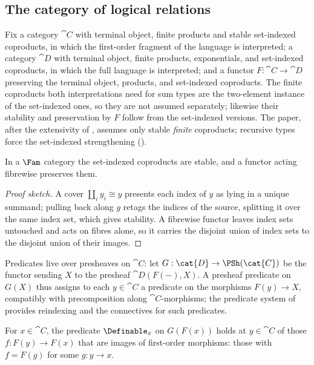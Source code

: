 \subsection{The category of logical relations}
\label{sec:conservativity:glueing}

Fix a category $\cat{C}$ with terminal object, finite products and stable set-indexed coproducts,
in which the first-order fragment of the language is interpreted; a category $\cat{D}$ with terminal
object, finite products, exponentials, and set-indexed coproducts, in which the full
language is interpreted; and a functor $F : \cat{C} \to \cat{D}$ preserving the terminal object,
products, and set-indexed coproducts. The finite coproducts both interpretations need for sum types
are the two-element instance of the set-indexed ones, so they are not assumed separately; likewise
their stability and preservation by $F$ follow from the set-indexed versions. The paper, after the
extensivity of \citet{fiore-simpson99}, assumes only stable \emph{finite} coproducts; recursive
types force the set-indexed strengthening ().

\begin{lemma}
\label{lem:conservativity:fam-stable-coproducts}
In a $\Fam$ category the set-indexed coproducts are stable, and a functor acting fibrewise
preserves them.
\end{lemma}

\begin{proof}[Proof sketch]
A cover $\coprod_i y_i \cong y$ presents each index of $y$ as lying in a unique summand; pulling
back along $g$ retags the indices of the source, splitting it over the same index set, which gives
stability. A fibrewise functor leaves index sets untouched and acts on fibres alone, so it carries
the disjoint union of index sets to the disjoint union of their images.
\end{proof}

Predicates live over presheaves on $\cat{C}$: let $G : \cat{D} \to \PSh(\cat{C})$ be the functor
sending $X$ to the presheaf $\cat{D}(F(-), X)$. A presheaf predicate on $G(X)$ thus
assigns to each $y \in \cat{C}$ a predicate on the morphisms $F(y) \to X$, compatibly with
precomposition along $\cat{C}$-morphisms; the predicate system of  provides
reindexing and the connectives for such predicates.

\begin{definition}[Definability]
\label{def:conservativity:definable}
For $x \in \cat{C}$, the predicate $\Definable_x$ on $G(F(x))$ holds at $y \in \cat{C}$ of those $f :
F(y) \to F(x)$ that are images of first-order morphisms: those with $f = F(g)$ for some $g : y \to x$.
\end{definition}

